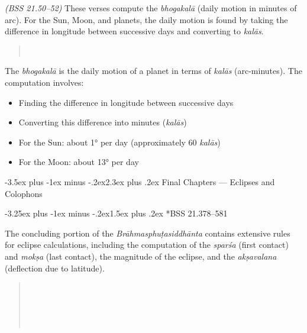 \documentclass[11pt,a4paper]{article}
\makeatletter
\renewcommand{\section}{\@startsection {section}{1}{\z@}%
  {-3.5ex plus -1ex minus -.2ex}{2.3ex plus .2ex}%
  {\normalfont\Large\bfseries\color{sectioncolor}}}
\renewcommand{\subsection}{\@startsection{subsection}{2}{\z@}%
  {-3.25ex plus -1ex minus -.2ex}{1.5ex plus .2ex}%
  {\normalfont\large\bfseries\color{sectioncolor}}}
\newcommand{\cnote}[1]{\textcolor{notecolor}{\textit{#1}}}
\newenvironment{shloka}{%
  \begin{quote}\devanagarifont\small%
}{\end{quote}}
\newenvironment{hindicomm}{%
  \begin{quote}\devanagarifont\small%
}{\end{quote}}
\newcommand{\verseno}[1]{\textcolor{versenumbercolor}{\textbardbl{\devanagarifont #1}\textbardbl}}
\makeatother
\begin{document}
\cnote{(BSS 21.50--52)} These verses compute the \textit{bhogakal\=a} (daily motion in minutes of arc). For the Sun, Moon, and planets, the daily motion is found by taking the difference in longitude between successive days and converting to \textit{kal\=as}.

\begin{hindicomm}
\\
\end{hindicomm}

The \textit{bhogakal\=a} is the daily motion of a planet in terms of \textit{kal\=as} (arc-minutes). The computation involves:
\begin{itemize}
  \item Finding the difference in longitude between successive days
  \item Converting this difference into minutes (\textit{kal\=as})
  \item For the Sun: about 1° per day (approximately 60 \textit{kal\=as})
  \item For the Moon: about 13° per day
\end{itemize}

\newpage
\section{Final Chapters --- Eclipses and Colophons}

\subsection*{BSS 21.378--581 \verseno{३७८--५८१}}

The concluding portion of the \textit{Br\=ahmasphu\d tasiddh\=anta} contains extensive rules for eclipse calculations, including the computation of the \textit{spar\'sa} (first contact) and \textit{mok\d sa} (last contact), the magnitude of the eclipse, and the \textit{ak\d savalana} (deflection due to latitude).

\begin{shloka}
\\
\\
\\
\\
\end{shloka}
\end{document}
